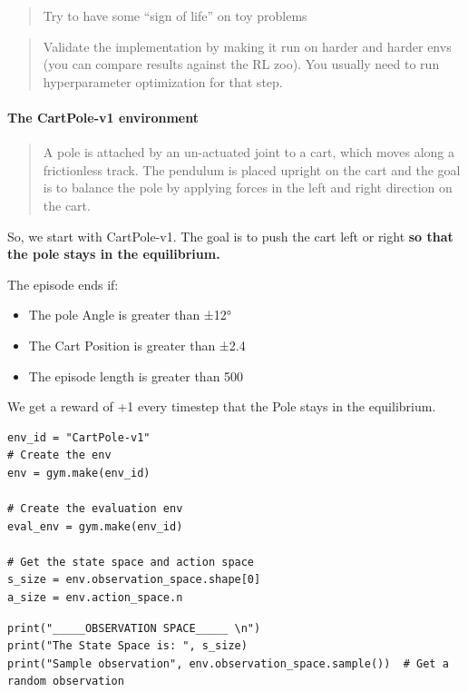 \documentclass[11pt,a4paper]{article}
\begin{document}
\begin{quote}
Try to have some ``sign of life'' on toy problems
\end{quote}

\begin{quote}
Validate the implementation by making it run on harder and harder envs (you can compare results against the RL zoo). You usually need to run hyperparameter optimization for that step.
\end{quote}

\paragraph{The CartPole-v1 environment}\label{the-cartpole-v1-environment}

\begin{quote}
A pole is attached by an un-actuated joint to a cart, which moves along a frictionless track. The pendulum is placed upright on the cart and the goal is to balance the pole by applying forces in the left and right direction on the cart.
\end{quote}

So, we start with CartPole-v1. The goal is to push the cart left or right \textbf{so that the pole stays in the equilibrium.}

The episode ends if:

\begin{itemize}
\tightlist
\item
  The pole Angle is greater than ±12°
\item
  The Cart Position is greater than ±2.4
\item
  The episode length is greater than 500
\end{itemize}

We get a reward of +1 every timestep that the Pole stays in the equilibrium.

\begin{lstlisting}
env_id = "CartPole-v1"
# Create the env
env = gym.make(env_id)

# Create the evaluation env
eval_env = gym.make(env_id)

# Get the state space and action space
s_size = env.observation_space.shape[0]
a_size = env.action_space.n
\end{lstlisting}

\begin{lstlisting}
print("_____OBSERVATION SPACE_____ \n")
print("The State Space is: ", s_size)
print("Sample observation", env.observation_space.sample())  # Get a random observation
\end{lstlisting}
\end{document}
